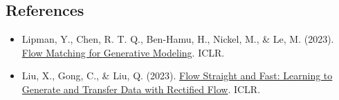 \FloatBarrier
{}
\hypertarget{references-135}{%
\subsection{References}\label{references-135}}

\vspace{0.25em}
\begin{itemize}
\tightlist
\item
  Lipman, Y., Chen, R. T. Q., Ben-Hamu, H., Nickel, M., \& Le, M. (2023). \href{https://arxiv.org/abs/2210.02747}{Flow Matching for Generative Modeling}. ICLR.
\item
  Liu, X., Gong, C., \& Liu, Q. (2023). \href{https://arxiv.org/abs/2209.03003}{Flow Straight and Fast: Learning to Generate and Transfer Data with Rectified Flow}. ICLR.
\end{itemize}

\clearpage
